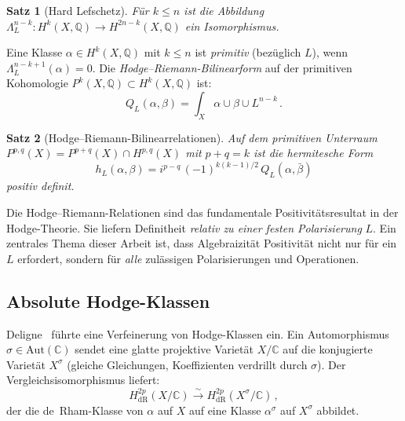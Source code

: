\documentclass[aps,prd,twocolumn,superscriptaddress,nofootinbib]{revtex4-2}
\newtheorem{theorem}{Satz}[section]
\theoremstyle{definition}
\theoremstyle{remark}
\begin{document}
\begin{theorem}[Hard Lefschetz]
\label{thm:hard_lefschetz}
Für $k \leq n$ ist die Abbildung $\Lambda_L^{n-k}: H^k(X, \mathbb{Q}) \to H^{2n-k}(X, \mathbb{Q})$ ein Isomorphismus.
\end{theorem}

Eine Klasse $\alpha \in H^k(X, \mathbb{Q})$ mit $k \leq n$ ist \textit{primitiv} (bezüglich $L$), wenn $\Lambda_L^{n-k+1}(\alpha) = 0$. Die \textit{Hodge--Riemann-Bilinearform} auf der primitiven Kohomologie $P^k(X, \mathbb{Q}) \subset H^k(X, \mathbb{Q})$ ist:
\begin{equation}
Q_L(\alpha, \beta) = \int_X \alpha \cup \beta \cup L^{n-k}\,.
\label{eq:HR_form}
\end{equation}

\begin{theorem}[Hodge--Riemann-Bilinearrelationen]
\label{thm:HR}
Auf dem primitiven Unterraum $P^{p,q}(X) = P^{p+q}(X) \cap H^{p,q}(X)$ mit $p + q = k$ ist die hermitesche Form
\begin{equation}
h_L(\alpha, \beta) = i^{p-q}\,(-1)^{k(k-1)/2}\, Q_L(\alpha, \bar{\beta})
\label{eq:HR_hermitian}
\end{equation}
positiv definit.
\end{theorem}

Die Hodge--Riemann-Relationen sind das fundamentale Positivitätsresultat in der Hodge-Theorie. Sie liefern Definitheit \textit{relativ zu einer festen Polarisierung} $L$. Ein zentrales Thema dieser Arbeit ist, dass Algebraizität Positivität nicht nur für ein $L$ erfordert, sondern für \textit{alle} zulässigen Polarisierungen und Operationen.

\subsection{Absolute Hodge-Klassen}

Deligne~\cite{Deligne1982} führte eine Verfeinerung von Hodge-Klassen ein. Ein Automorphismus $\sigma \in \mathrm{Aut}(\mathbb{C})$ sendet eine glatte projektive Varietät $X/\mathbb{C}$ auf die konjugierte Varietät $X^\sigma$ (gleiche Gleichungen, Koeffizienten verdrillt durch $\sigma$). Der Vergleichsisomorphismus liefert:
\begin{equation}
H^{2p}_{\mathrm{dR}}(X/\mathbb{C}) \xrightarrow{\sim} H^{2p}_{\mathrm{dR}}(X^\sigma/\mathbb{C})\,,
\end{equation}
der die de~Rham-Klasse von $\alpha$ auf $X$ auf eine Klasse $\alpha^\sigma$ auf $X^\sigma$ abbildet.
\end{document}
